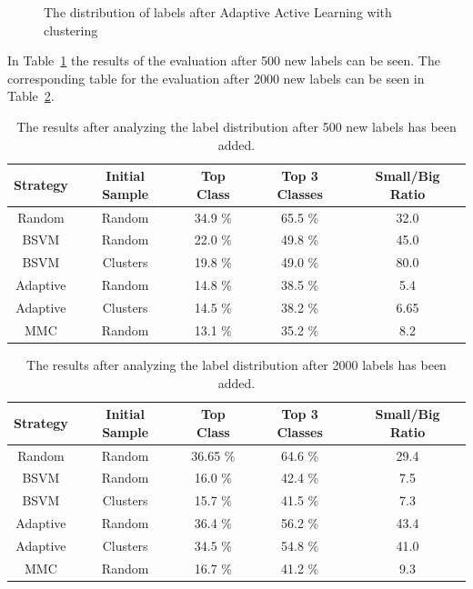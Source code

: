 \begin{figure}
    \centering
    \caption{The distribution of labels after Adaptive Active Learning with clustering}
    \label{fig:class-distribution-reuters-adaptive-clusters}
\end{figure}

In Table~\ref{tab:distribution-result-500} the results of the evaluation after 500 new labels can be seen.
The corresponding table for the evaluation after 2000 new labels can be seen in Table~\ref{tab:distribution-result-2000}.

\begin{table}[h!]
    \centering
    \begin{tabular}{|ccccc|}
        \hline
        \textbf{Strategy} & \textbf{Initial Sample} & \textbf{Top Class} & \textbf{Top 3 Classes} & \textbf{Small/Big Ratio}\\
        \hline
        Random & Random &  34.9 \% & 65.5 \% & 32.0 \\
        BSVM & Random &  22.0 \% & 49.8 \% & 45.0 \\
        BSVM & Clusters & 19.8 \% & 49.0 \% & 80.0 \\
        Adaptive & Random & 14.8 \% & 38.5 \% & 5.4 \\
        Adaptive & Clusters & 14.5 \% & 38.2 \% & 6.65 \\
        MMC & Random & 13.1 \% & 35.2 \% & 8.2 \\
        \hline
    \end{tabular}
    \caption{The results after analyzing the label distribution after 500 new labels has been added.}
    \label{tab:distribution-result-500}
\end{table}

\begin{table}[h!]
    \centering
    \begin{tabular}{|ccccc|}
        \hline
        \textbf{Strategy} & \textbf{Initial Sample} & \textbf{Top Class} & \textbf{Top 3 Classes} & \textbf{Small/Big Ratio}\\
        \hline
        Random & Random & 36.65 \% & 64.6 \% & 29.4 \\
        BSVM & Random & 16.0 \% & 42.4 \% & 7.5 \\
        BSVM & Clusters & 15.7 \% & 41.5 \% & 7.3 \\
        Adaptive & Random & 36.4 \% & 56.2 \% & 43.4 \\
        Adaptive & Clusters & 34.5 \% & 54.8 \% & 41.0 \\
        MMC & Random & 16.7 \% & 41.2 \% & 9.3 \\
        \hline
    \end{tabular}
    \caption{The results after analyzing the label distribution after 2000 labels has been added.}
    \label{tab:distribution-result-2000}
\end{table}